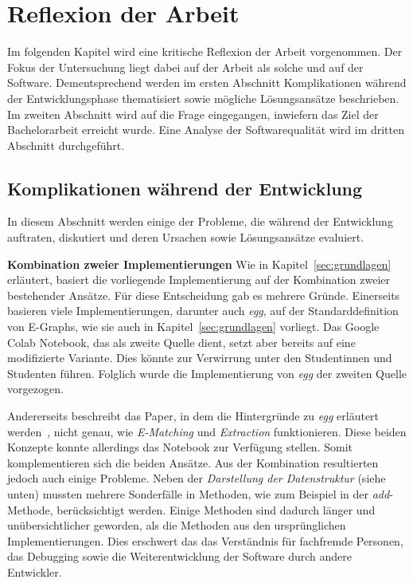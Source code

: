 \section{Reflexion der Arbeit}\label{sec:reflexion}

Im folgenden Kapitel wird eine kritische Reflexion der Arbeit vorgenommen. 
Der Fokus der Untersuchung liegt dabei auf der Arbeit als solche und auf der Software.
Dementsprechend werden im ersten Abschnitt Komplikationen während der Entwicklungsphase thematisiert sowie mögliche Lösungsansätze beschrieben.
Im zweiten Abschnitt wird auf die Frage eingegangen, inwiefern das Ziel der Bachelorarbeit erreicht wurde.
Eine Analyse der Softwarequalität wird im dritten Abschnitt durchgeführt.

\subsection{Komplikationen während der Entwicklung}\label{sec:probleme}

In diesem Abschnitt werden einige der Probleme, die während der Entwicklung auftraten, diskutiert und deren Ursachen sowie Lösungsansätze evaluiert.

\noindent\textbf{Kombination zweier Implementierungen} Wie in Kapitel~\ref{sec:grundlagen} erläutert, basiert die vorliegende Implementierung
auf der Kombination zweier bestehender Ansätze. Für diese Entscheidung gab es mehrere Gründe.
Einerseits basieren viele Implementierungen, darunter auch \textit{egg}, auf der Standarddefinition von E-Graphs, wie sie auch in Kapitel~\ref{sec:grundlagen} vorliegt.
Das Google Colab Notebook, das als zweite Quelle dient, setzt aber bereits auf eine modifizierte Variante. Dies könnte zur Verwirrung unter den Studentinnen und Studenten
führen. Folglich wurde die Implementierung von \textit{egg} der zweiten Quelle vorgezogen.

Andererseits beschreibt das Paper, in dem die Hintergründe zu \textit{egg} erläutert werden~\cite{2021-egg}, nicht genau, wie \textit{E-Matching} und \textit{Extraction} funktionieren.  
Diese beiden Konzepte konnte allerdings das Notebook zur Verfügung stellen. Somit komplementieren sich die beiden Ansätze.
Aus der Kombination resultierten jedoch auch einige Probleme. Neben der \textit{Darstellung der Datenstruktur} (siehe unten) mussten mehrere Sonderfälle in Methoden, wie zum Beispiel in der \textit{add}-Methode,
berücksichtigt werden. Einige Methoden sind dadurch länger und unübersichtlicher geworden, als die Methoden aus den ursprünglichen Implementierungen. 
Dies erschwert das das Verständnis für fachfremde Personen, das Debugging sowie die Weiterentwicklung der Software durch andere Entwickler.

